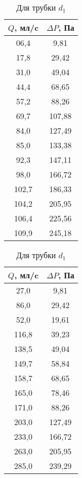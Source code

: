 \begin{table}[!htb]
  \begin{minipage}{.5\linewidth}
    \caption{Для трубки $d_1$}
    \centering
      \begin{tabular}{|c|c|}
      \hline
      $Q$, мл/c & $\Delta P$, Па \\ \hline
      06,4 &   9,81 \\ \hline
      17,8 &  29,42 \\ \hline
      31,0 &  49,04 \\ \hline
      44,4 &  68,65 \\ \hline
      57,2 &  88,26 \\ \hline
      69,7 & 107,88 \\ \hline
      84,0 & 127,49 \\ \hline
      85,0 & 133,38 \\ \hline
      92,3 & 147,11 \\ \hline
      98,0 & 166,72 \\ \hline
      102,7 & 186,33 \\ \hline
      104,2 & 205,95 \\ \hline
      106,4 & 225,56 \\ \hline
      109,9 & 245,18 \\ \hline
      \end{tabular}
  \end{minipage}
  \begin{minipage}{.5\linewidth}
    \centering
      \begin{tabular}{|c|c|}
      \hline
      $Q$, мл/c &  $\Delta P$, Па \\ \hline
        27,0 &          9,81 \\ \hline
        86,0 &         29,42 \\ \hline
        52,0 &         19,61 \\ \hline
        116,8 &         39,23 \\ \hline
        138,5 &         49,04 \\ \hline
        149,7 &         58,84 \\ \hline
        158,7 &         68,65 \\ \hline
        165,0 &         78,46 \\ \hline
        171,0 &         88,26 \\ \hline
        203,0 &        127,49 \\ \hline
        233,0 &        166,72 \\ \hline
        263,0 &        205,95 \\ \hline
        285,0 &        239,29 \\ \hline
      \end{tabular}
  \end{minipage} 
\end{table}

